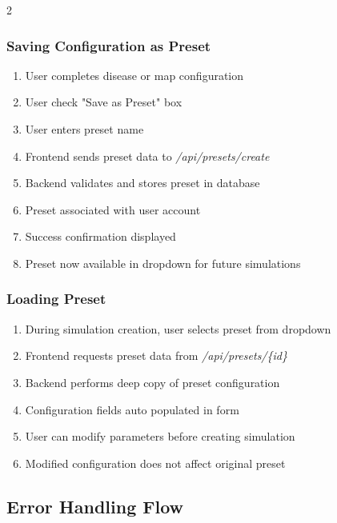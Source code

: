 \begin{multicols}{2}
\subsubsection*{Saving Configuration as Preset}
\begin{enumerate}
    \item User completes disease or map configuration
    \item User check "Save as Preset" box
    \item User enters preset name 
    \item Frontend sends preset data to \textit{/api\allowbreak/presets\allowbreak/create}
    \item Backend validates and stores preset in database
    \item Preset associated with user account
    \item Success confirmation displayed
    \item Preset now available in dropdown for future simulations
\end{enumerate}

\subsubsection*{Loading Preset}
\begin{enumerate}
    \item During simulation creation, user selects preset from dropdown
    \item Frontend requests preset data from \textit{/api\allowbreak/presets\allowbreak/\{id\}}
    \item Backend performs deep copy of preset configuration
    \item Configuration fields auto populated in form
    \item User can modify parameters before creating simulation
    \item Modified configuration does not affect original preset
\end{enumerate}

\subsection{Error Handling Flow}


\end{multicols}
